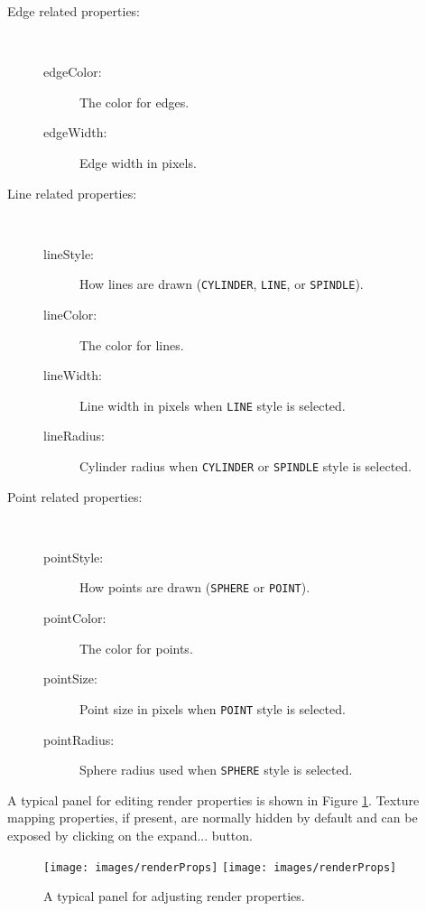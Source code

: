 \documentclass{article}
\begin{document}
\begin{description}
\item[Edge related properties:]
\hfil \\
\begin{description}
\item[edgeColor:]
The color for edges.
\item[edgeWidth:]
Edge width in pixels.
\end{description}

\item[Line related properties:]
\hfil \\
\begin{description}
\item[lineStyle:] 
How lines are drawn ({\tt CYLINDER}, {\tt LINE}, or {\tt SPINDLE}).
\item[lineColor:]
The color for lines.
\item[lineWidth:]
Line width in pixels when {\tt LINE} style is selected.
\item[lineRadius:]
Cylinder radius when {\tt CYLINDER} or {\tt SPINDLE} style is selected.
\end{description}

\item[Point related properties:]
\hfil \\
\begin{description}
\item[pointStyle:] 
How points are drawn ({\tt SPHERE} or {\tt POINT}).
\item[pointColor:] 
The color for points.
\item[pointSize:] 
Point size in pixels when {\tt POINT} style is selected.
\item[pointRadius:] 	
Sphere radius used when {\tt SPHERE} style is selected.
\end{description}

\end{description}

A typical panel for editing render properties is shown in Figure
\ref{renderpropsFig}. Texture mapping properties, if present, are
normally hidden by default and can be exposed by clicking on the {\sf
expand...} button.

\begin{figure}[h]
\begin{center}
\iflatexml
\texttt{[image: images/renderProps]}
\else
\texttt{[image: images/renderProps]}
\fi
\end{center}
\caption{A typical panel for adjusting render properties.}%
\label{renderpropsFig}
\end{figure}
\end{document}
